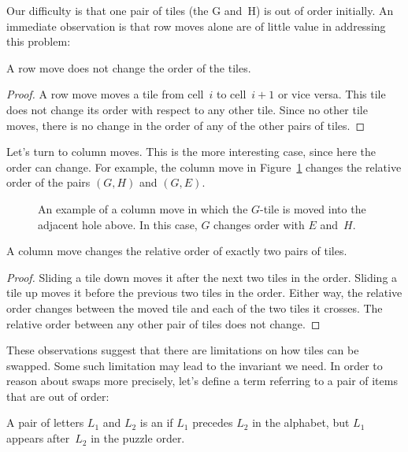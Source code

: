 Our difficulty is that one pair of tiles (the G and~H) is out of order
initially.  An immediate observation is that row moves alone are of
little value in addressing this problem:
\begin{lemma}\label{lem:8puzzleA}
A row move does not change the order of the tiles.
\end{lemma}

\begin{proof}
A row move moves a tile from cell~$i$ to cell~$i + 1$ or vice versa.
This tile does not change its order with respect to any other tile.
Since no other tile moves, there is no change in the order of any of
the other pairs of tiles.
\end{proof}

Let's turn to column moves.  This is the more interesting case, since
here the order can change.  For example, the column move in
Figure~\ref{fig:8columnmove} changes the relative order of the pairs
$(G, H)$ and $(G, E)$.

\begin{figure}

\qquad\qquad
{}

\caption{An example of a column move in which the $G$-tile is moved
  into the adjacent hole above.  In this case, $G$ changes order with
  $E$ and~$H$.}

\label{fig:8columnmove}

\end{figure}

\begin{lemma}\label{lem:8puzzleB}
A column move  changes the relative order of exactly two pairs of
tiles.
\end{lemma}

\begin{proof}
Sliding a tile down moves it after the next two tiles in the order.
Sliding a tile up moves it before the previous two tiles in the
order.  Either way, the relative order changes between the moved tile
and each of the two tiles it crosses.  The relative order between any other
pair of tiles does not change.
\end{proof}

These observations suggest that there are limitations on how tiles can
be swapped.  Some such limitation may lead to the invariant we need.
In order to reason about swaps more precisely, let's define a term
referring to a pair of items that are out of order:
\begin{definition}\label{def:8inversion}
A pair of letters $L_1$ and $L_2$ is an  if $L_1$
precedes $L_2$ in the alphabet, but $L_1$ appears after~$L_2$ in the
puzzle order.
\end{definition}

